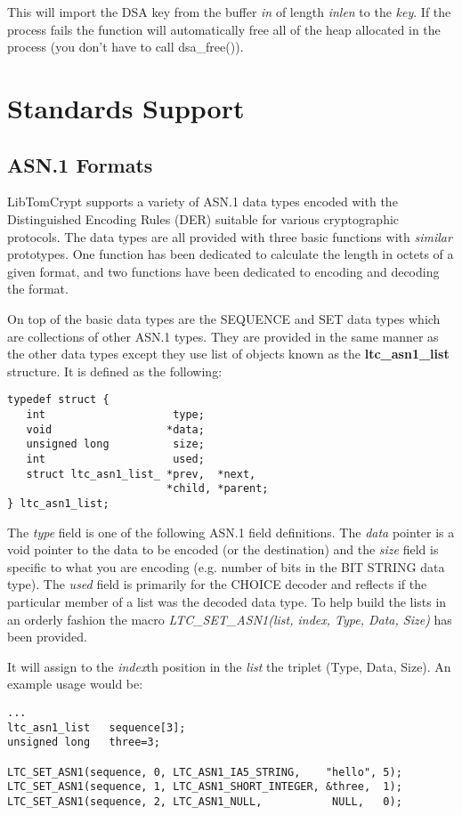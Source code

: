 \documentclass[synpaper]{book}
\newcommand{\mysection}[1]    %
	{                   %
	\section{#1}
   \markboth{\textsf{www.libtom.org}}{\thesection ~ {#1}}
	}
\begin{document}
This will import the DSA key from the buffer \textit{in} of length \textit{inlen} to the \textit{key}.  If the process fails the function
will automatically free all of the heap allocated in the process (you don't have to call dsa\_free()).

\chapter{Standards Support}
\mysection{ASN.1 Formats}
LibTomCrypt supports a variety of ASN.1 data types encoded with the Distinguished Encoding Rules (DER) suitable for various cryptographic protocols.  The data types
are all provided with three basic functions with \textit{similar} prototypes.  One function has been dedicated to calculate the length in octets of a given
format, and two functions have been dedicated to encoding and decoding the format.

On top of the basic data types are the SEQUENCE and SET data types which are collections of other ASN.1 types.  They are provided
in the same manner as the other data types except they use list of objects known as the \textbf{ltc\_asn1\_list} structure.  It is defined as the following:

\begin{verbatim}
typedef struct {
   int                    type;
   void                  *data;
   unsigned long          size;
   int                    used;
   struct ltc_asn1_list_ *prev,  *next,
                         *child, *parent;
} ltc_asn1_list;
\end{verbatim}

The \textit{type} field is one of the following ASN.1 field definitions.  The \textit{data} pointer is a void pointer to the data to be encoded (or the destination) and the
\textit{size} field is specific to what you are encoding (e.g. number of bits in the BIT STRING data type).  The \textit{used} field is primarily for the CHOICE decoder
and reflects if the particular member of a list was the decoded data type.  To help build the lists in an orderly fashion the macro
\textit{LTC\_SET\_ASN1(list, index, Type, Data, Size)} has been provided.

It will assign to the \textit{index}th position in the \textit{list} the triplet (Type, Data, Size).  An example usage would be:

\begin{small}
\begin{verbatim}
...
ltc_asn1_list   sequence[3];
unsigned long   three=3;

LTC_SET_ASN1(sequence, 0, LTC_ASN1_IA5_STRING,    "hello", 5);
LTC_SET_ASN1(sequence, 1, LTC_ASN1_SHORT_INTEGER, &three,  1);
LTC_SET_ASN1(sequence, 2, LTC_ASN1_NULL,           NULL,   0);
\end{verbatim}
\end{small}
\end{document}
